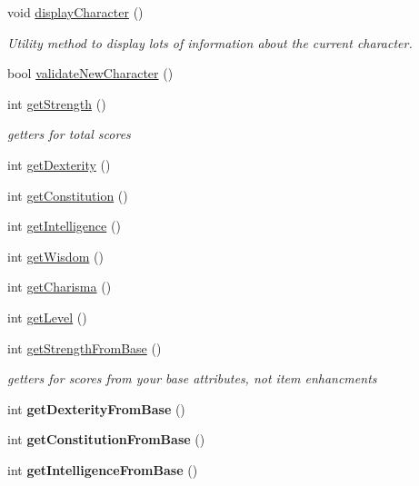 \begin{DoxyCompactItemize}
void \hyperlink{classCharacter_a18ff2d8cf9264e321e1faff4e8bd0c7c}{display\+Character} ()
\begin{DoxyCompactList}\small\item\em Utility method to display lots of information about the current character. \end{DoxyCompactList}\item 
bool \hyperlink{classCharacter_adae2bb0e0bb6b8d010be6d1ac3b1fd5f}{validate\+New\+Character} ()
\item 
int \hyperlink{classCharacter_a8ccbb82b13e59f02c9df0b321fae577d}{get\+Strength} ()
\begin{DoxyCompactList}\small\item\em getters for total scores \end{DoxyCompactList}\item 
int \hyperlink{classCharacter_a86b9d59f326c3df44a6bf2484fd95a7c}{get\+Dexterity} ()
\item 
int \hyperlink{classCharacter_a2f731997fba7630b66c0686ee2c10a8f}{get\+Constitution} ()
\item 
int \hyperlink{classCharacter_a0cd463a2b68c2cc2b73707b859709635}{get\+Intelligence} ()
\item 
int \hyperlink{classCharacter_a4d4d5548ed8ed813e4f59f123180afcb}{get\+Wisdom} ()
\item 
int \hyperlink{classCharacter_af03c7318bd3015262a0f4873b74a1d51}{get\+Charisma} ()
\item 
int \hyperlink{classCharacter_ade8602e9521fc4c1849d1d1026bc0399}{get\+Level} ()
\item 
int \hyperlink{classCharacter_a0c9f1088f6b98c5fb5080267dd7cde49}{get\+Strength\+From\+Base} ()
\begin{DoxyCompactList}\small\item\em getters for scores from your base attributes, not item enhancments \end{DoxyCompactList}\item 
\hypertarget{classCharacter_a9d9f78f0f550737bc8657c74bafd1da7}{}\label{classCharacter_a9d9f78f0f550737bc8657c74bafd1da7} 
int {\bfseries get\+Dexterity\+From\+Base} ()
\item 
\hypertarget{classCharacter_a4917e88b4954b7c8bf5cca9bac814eee}{}\label{classCharacter_a4917e88b4954b7c8bf5cca9bac814eee} 
int {\bfseries get\+Constitution\+From\+Base} ()
\item 
\hypertarget{classCharacter_a693fb1317d566aac988c575a2252ce0b}{}\label{classCharacter_a693fb1317d566aac988c575a2252ce0b} 
int {\bfseries get\+Intelligence\+From\+Base} ()

\end{DoxyCompactItemize}
